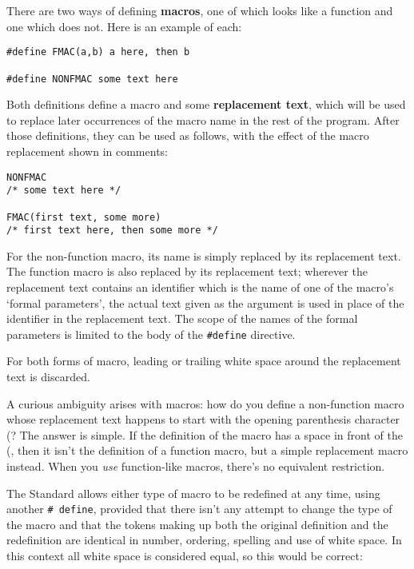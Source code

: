    There are two ways of defining \textbf{macros}, one of which looks
    like a function and one which does not. Here is an example of each:


   \begin{Verbatim}
#define FMAC(a,b) a here, then b

#define NONFMAC some text here
\end{Verbatim}

   Both definitions define a macro and some \textbf{replacement text},
    which will be used to replace later occurrences of the macro name in the
    rest of the program. After those definitions, they can be used as
    follows, with the effect of the macro replacement shown in comments:


   \begin{Verbatim}
NONFMAC
/* some text here */

FMAC(first text, some more)
/* first text here, then some more */
\end{Verbatim}

   For the non-function macro, its name is simply replaced by its
    replacement text. The function macro is also replaced by its replacement
    text; wherever the replacement text contains an identifier which is the
    name of one of the macro's `formal parameters', the actual text
    given as the argument is used in place of the identifier in the
    replacement text. The scope of the names of the formal parameters is
    limited to the body of the \texttt{\#define} directive.


   For both forms of macro, leading or trailing white space around the
    replacement text is discarded.


   A curious ambiguity arises with macros: how do you define
    a non-function macro whose replacement text happens to start with the
    opening parenthesis character (? The answer is simple. If the definition
    of the macro has a space in front of the (, then it isn't the definition
    of a function macro, but a simple replacement macro instead. When you
    \textit{use} function-like macros, there's no equivalent
    restriction.


   The Standard allows either type of macro to be redefined at any time,
    using another \texttt{\# define}, provided that there isn't any
    attempt to change the type of the macro and that the tokens making up
    both the original definition and the redefinition are identical in
    number, ordering, spelling and use of white space. In this context all
    white space is considered equal, so this would be correct:


